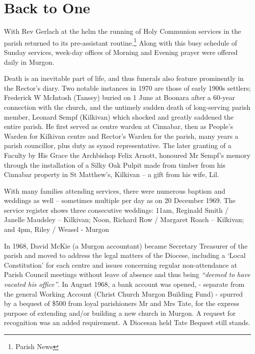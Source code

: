 \section{Back to One}



With Rev Gerlach at the helm the running of Holy Communion services in the parish returned to its pre-assistant routine.\footnote{Parish News} Along with this busy schedule of Sunday services, week-day offices of Morning and Evening prayer were offered daily in Murgon.


Death is an inevitable part of life, and thus funerals also feature prominently in the Rector's diary. Two notable instances in 1970 are those of early 1900s settlers; Frederick W McIntosh (Tansey) buried on 1 June at Boonara after a 60-year connection with the church, and the untimely sudden death of long-serving parish member, Leonard Sempf (Kilkivan) which shocked and greatly saddened the entire parish. He first served as centre warden at Cinnabar, then as People's Warden for Kilkivan centre and Rector's Warden for the parish, many years a parish councillor, plus duty as synod representative. The later granting of a Faculty by His Grace the Archbishop Felix Arnott, honoured Mr Sempf's memory through the installation of a Silky Oak Pulpit made from timber from his Cinnabar property in St Matthew's, Kilkivan -- a gift from his wife, Lil.



With many families attending services, there were numerous baptism and weddings as well -- sometimes multiple per day as on 20 December 1969. The service register shows three consecutive weddings: 11am, Reginald Smith / Janelle Maudsley -- Kilkivan; Noon, Richard Row / Margaret Roach -- Kilkivan; and 4pm, Riley / Weasel - Murgon



In 1968, David McKie (a Murgon accountant) became Secretary Treasurer of the parish and moved to address the legal matters of the Diocese, including a `Local Constitution' for each centre and issues concerning regular non-attendance at Parish Council meetings without leave of absence and thus being \emph{``deemed to have vacated his office''}. In August 1968, a bank account was opened, - separate from the general Working Account (Christ Church Murgon Building Fund) - spurred by a bequest of \$500 from loyal parishioners Mr and Mrs Tate, for the express purpose of extending and/or building a new church in Murgon. A request for recognition was an added requirement. A Diocesan held Tate Bequest still stands.



